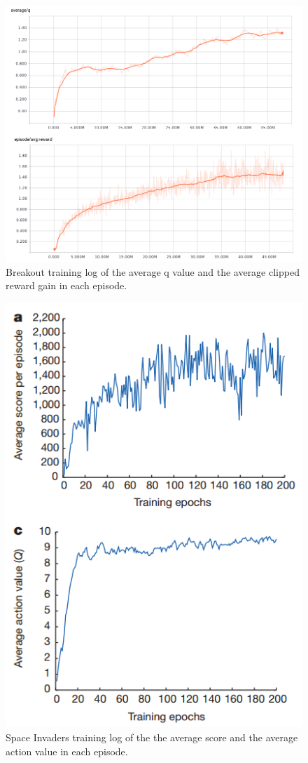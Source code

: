 \documentclass[10pt,twocolumn,letterpaper]{article}
\begin{document}
\begin{CJK}{UTF8}{gbsn}
\begin{figure}
\begin{center}
   \includegraphics[width=0.65\linewidth]{breakout_res.PNG}
\end{center}
\caption{Breakout training log of the average q value and the average clipped reward gain in each episode.}
\label{fig:breakout_log}
\end{figure}

\begin{figure}
\begin{center}
   \includegraphics[width=1.0\linewidth]{paper_res.PNG}
\end{center}
\caption{Space Invaders training log of the the average score and the average action value in each episode.\cite{mnih2015human}}
\label{fig:paper_log}
\end{figure}


\end{CJK}
\end{document}
